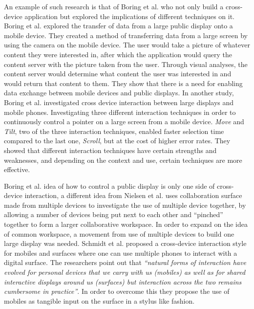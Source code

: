 An example of such research is that of Boring et al. \cite{Boring:2007} who not only build a cross-device application but explored the implications of different techniques on it. Boring et al. explored the transfer of data from a large public display onto a mobile device.
They created a method of transferring data from a large screen by using the camera on the mobile device.
The user would take a picture of whatever content they were interested in, after which the application would query the content server with the picture taken from the user.
Through visual analyses, the content server would determine what content the user was interested in and would return that content to them.
They show that there is a need for enabling data exchange between mobile devices and public displays.
In another study, Boring et al. \cite{Boring:2009} investigated cross device interaction between large displays and mobile phones.
Investigating three different interaction techniques in order to continuously control a pointer on a large screen from a mobile device.
\emph{Move} and \emph{Tilt}, two of the three interaction techniques, enabled faster selection time compared to the last one, \emph{Scroll}, but at the cost of higher error rates.
They showed that different interaction techniques have certain strengths and weaknesses, and depending on the context and use, certain techniques are more effective.

Boring et al. idea \cite{Boring:2007,Boring:2009} of how to control a public display is only one side of cross-device interaction, a different idea from Nielsen et al. \cite{Nielsen:2014} uses collaboration surface made from multiple devices to investigate the  use of multiple device together, by allowing a number of devices being put next to each other and ``pinched'' together to form a larger collaborative workspace.
In order to expand on the idea of common workspace, a movement from use of multiple devices to build one large display was needed. Schmidt et al. \cite{Schmidt:2012} proposed a cross-device interaction style for mobiles and surfaces where one can use multiple phones to interact with a digital surface.
The researchers point out that \emph{``natural forms of interaction have evolved for personal devices that we carry with us (mobiles) as well as for shared interactive displays around us (surfaces) but interaction across the two remains cumbersome in practice''}. In order to overcome this they propose the use of mobiles as tangible input on the surface in a stylus like fashion.\\

